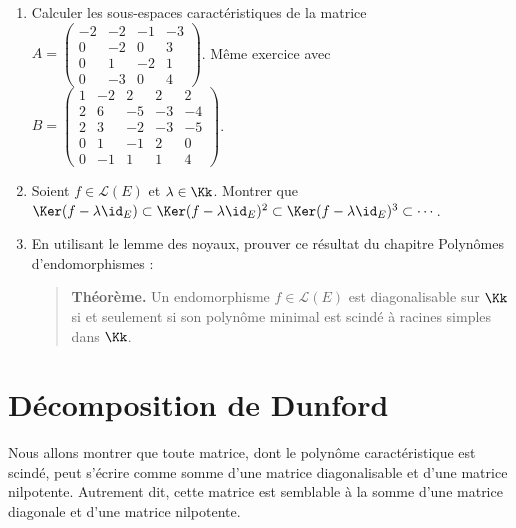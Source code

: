 \documentclass[12pt, class=report,crop=false]{standalone}
\begin{document}
 
\begin{miniexercices}
\sauteligne
\begin{enumerate}
  \item Calculer les sous-espaces caractéristiques de la matrice  
  $A = \left(\begin{smallmatrix}
-2 & -2 & -1 & -3 \\
0 & -2 & 0 & 3 \\
0 & 1 & -2 & 1 \\
0 & -3 & 0 & 4
  \end{smallmatrix}\right)$.
  Même exercice avec
  $B = \left(\begin{smallmatrix}
1 & -2 & 2 & 2 & 2 \\
2 & 6 & -5 & -3 & -4 \\
2 & 3 & -2 & -3 & -5 \\
0 & 1 & -1 & 2 & 0 \\
0 & -1 & 1 & 1 & 4
  \end{smallmatrix}\right)$.

  \item Soient $f \in \mathcal{L}(E)$ et $\lambda \in \Kk$. Montrer que $\Ker(f-\lambda \id_E) \subset \Ker(f-\lambda \id_E)^2 \subset \Ker(f-\lambda \id_E)^3 \subset \cdots$.
  
  \item En utilisant le lemme des noyaux, prouver ce résultat du chapitre \og{}Polynômes d'endomorphismes\fg{} :
  \begin{quote}
  \og{}\textbf{Théorème.} Un endomorphisme $f \in\mathcal{L}(E)$ est diagonalisable sur $\Kk$ si et seulement si son polynôme minimal est scindé à racines simples dans $\Kk$.\fg{}
  \end{quote}
\end{enumerate}
\end{miniexercices}




\section{Décomposition de Dunford}

Nous allons montrer que toute matrice, dont le polynôme caractéristique est scindé, peut s'écrire comme somme d'une matrice diagonalisable et d'une matrice nilpotente. Autrement dit, cette matrice est semblable à la somme d'une matrice diagonale et d'une matrice nilpotente.
\end{document}
